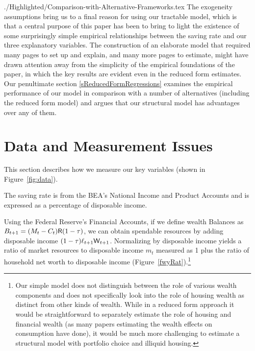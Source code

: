 \documentclass[titlepage]{\econtex}
\begin{document}
\begin{verbatimwrite}{./Highlighted/Comparison-with-Alternative-Frameworks.tex}
The exogeneity assumptions bring us to a final reason for using our tractable model, which is that a central purpose of this paper has been to bring to light the existence of some surprisingly simple empirical relationships between the saving rate and our three explanatory variables.  The construction of an elaborate model that required many pages to set up and explain, and many more pages to estimate, might have drawn attention away from the simplicity of the empirical foundations of the paper, in which the key results are evident even in the reduced form estimates.  Our penultimate section \ref{sReducedFormRegressions} examines the empirical performance of our model in comparison with a number of alternatives (including the reduced form model) and argues that our structural model has advantages over any of them.
\end{verbatimwrite}


\section{Data and Measurement Issues} \label{DataAndMeasurement} \hypertarget{DataAndMeasurement}{}

This section describes how we measure our key variables (shown in Figure~\ref{fig:data}).

The saving rate is from the BEA's National Income and Product Accounts and is expressed as a percentage of disposable income.

Using the Federal Reserve's Financial Accounts, if we define wealth Balances as $B_{t+1}=(M_{t}-C_{t})\mathsf{R}(1-\tau)$, we can obtain spendable resources by adding disposable income $(1-\tau)\ell_{t+1}\mathsf{W}_{t+1}$.  Normalizing by disposable income yields a ratio of market resources to disposable income $m_t$ measured as 1 plus the ratio of household net worth to disposable income (Figure~\ref{fwyRat}).\footnote{Our simple model does not distinguish between the role of various wealth components and does not specifically look into the role of housing wealth as distinct from other kinds of wealth. While in a reduced form approach it would be straightforward to separately estimate the role of housing and financial wealth (as many papers estimating the wealth effects on consumption have done), it would be much more challenging to estimate a structural model with portfolio choice and illiquid housing.}
\end{document}
